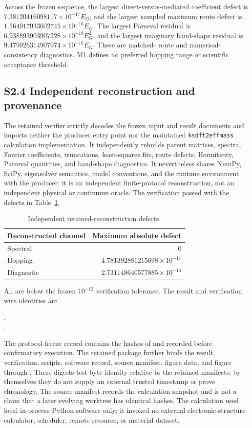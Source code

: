 Across the frozen sequence, the largest direct-versus-mediated coefficient
defect is $7.38120416098117\times10^{-17}E_G$, and the largest sampled maximum
route defect is $1.564917933602745\times10^{-16}E_G$. The largest Parseval
residual is $6.938893903907228\times10^{-18}E_G^2$, and the largest imaginary
band-shape residual is $9.479926314907974\times10^{-16}E_G$. These are matched-
route and numerical-consistency diagnostics. M1 defines no preferred hopping
range or scientific acceptance threshold.

\subsection*{S2.4 Independent reconstruction and provenance}

The retained verifier strictly decodes the frozen input and result documents
and imports neither the producer entry point nor the maintained
\texttt{ksdft2effmass} calculation implementation. It independently rebuilds
parent matrices, spectra, Fourier coefficients, truncations, least-squares
fits, route defects, Hermiticity, Parseval quantities, and band-shape
diagnostics. It nevertheless shares NumPy, SciPy, eigensolver semantics,
model conventions, and the runtime environment with the producer; it is an
independent finite-protocol reconstruction, not an independent physical or
continuum oracle. The verification passed with the defects in
Table~\ref{tab:supp-m1-verification}.

\begin{table}[ht]
\centering
\caption{Independent retained-reconstruction defects.}
\label{tab:supp-m1-verification}
\begin{tabular}{@{}lr@{}}
\toprule
Reconstructed channel & Maximum absolute defect \\
\midrule
Spectral & $0$ \\
Hopping & $4.781392881215698\times10^{-17}$ \\
Diagnostic & $2.731148640577885\times10^{-14}$ \\
\bottomrule
\end{tabular}
\end{table}

All are below the frozen $10^{-12}$ verification tolerance. The result and
verification wire identities are
\begin{center}
,\\
.
\end{center}
The protocol-freeze record contains the hashes of  and
 recorded before confirmatory execution. The retained package
further binds the result, verification, scripts, software record, source
manifest, figure data, and figure through . These digests test
byte identity relative to the retained manifests; by themselves they do not
supply an external trusted timestamp or prove chronology. The source manifest
records the calculation snapshot and is not a claim that a later evolving
worktree has identical hashes. The calculation used local in-process Python
software only; it invoked no external electronic-structure calculator,
scheduler, remote resource, or material dataset.
